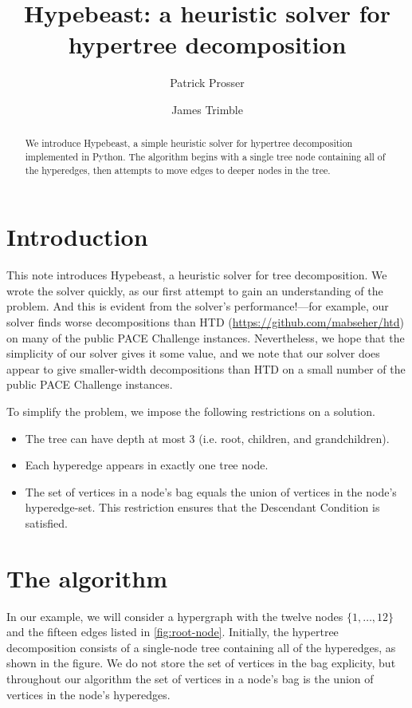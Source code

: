 \documentclass[a4paper,UKenglish,cleveref, autoref]{lipics-v2019}
\title{Hypebeast: a heuristic solver for hypertree decomposition}
\author{Patrick Prosser}{University of Glasgow, Scotland}{patrick.prosser@glasgow.ac.uk}{https://orcid.org/0000-0003-4460-6912}{}
\author{James Trimble}{University of Glasgow, Scotland}{j.trimble.1@research.gla.ac.uk}{https://orcid.org/0000-0001-7282-8745}{}
\begin{document}
\maketitle

\begin{abstract}
We introduce Hypebeast, a simple heuristic solver for hypertree decomposition implemented in Python.  The algorithm begins with a single tree node containing all of the hyperedges, then attempts to move edges to deeper nodes in the tree.
\end{abstract}

\section{Introduction}

This note introduces Hypebeast, a heuristic solver for tree decomposition.  We wrote the solver quickly, as our first attempt to gain an understanding of the problem.  And this is evident from the solver's performance!---for example, our solver finds worse decompositions than HTD (\url{https://github.com/mabseher/htd}) on many of the public PACE Challenge instances.  Nevertheless, we hope that the simplicity of our solver gives it some value, and we note that our solver does appear to give smaller-width decompositions than HTD on a small number of the public PACE Challenge instances.

To simplify the problem, we impose the following restrictions on a solution.

\begin{itemize}
  \item The tree can have depth at most 3 (i.e. root, children, and grandchildren).
  \item Each hyperedge appears in exactly one tree node.
  \item The set of vertices in a node's bag equals the union of vertices in the node's hyperedge-set.  This restriction ensures that the Descendant Condition is satisfied.
\end{itemize}

\section{The algorithm}

In our example, we will consider a hypergraph with the twelve nodes $\{1, \dots, 12\}$ and the fifteen edges listed in \ref{fig:root-node}.  Initially, the hypertree decomposition consists of a single-node tree containing all of the hyperedges, as shown in the figure.  We do not store the set of vertices in the bag explicity, but throughout our algorithm the set of vertices in a node's bag is the union of vertices in the node's hyperedges.
\end{document}
